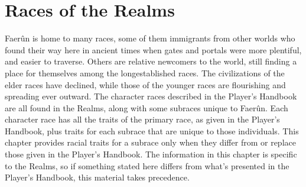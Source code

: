 \documentclass[10pt,a4paper,twoside,twocolumn,openany,bg=print,nodeprecatedcode]{dndbook}
\begin{document}
\chapter{Races of the Realms}
Faerûn is home to many races, some of them immigrants from other worlds who found their way here in ancient times when gates and portals were more plentiful, and easier to traverse. Others are relative newcomers to the world, still finding a place for themselves among the longestablished races. The civilizations of the elder races have declined, while those of the younger races are flourishing and spreading ever outward.
The character races described in the Player's Handbook are all found in the Realms, along with some subraces unique to Faerûn. Each character race has all the traits of the primary race, as given in the Player's Handbook, plus traits for each subrace that are unique to those individuals. This chapter provides racial traits for a subrace only when they differ from or replace those given in the Player's Handbook. The information in this chapter is specific to the Realms, so if something stated here differs from what's presented in the Player's Handbook, this material takes precedence.
\end{document}
